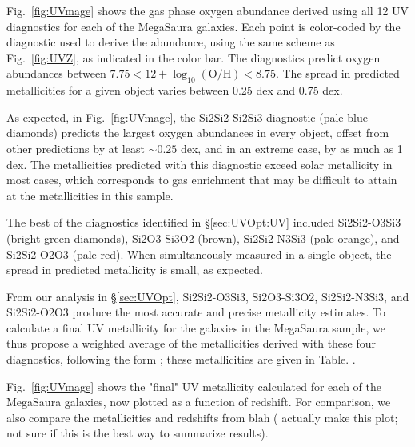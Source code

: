 \documentclass[preprint2]{aastex62}
\newcommand{\logten}{\ensuremath{\log_{10}}}
\newcommand{\logOH}{\ensuremath{\logten (\mathrm{O}/\mathrm{H})}\xspace}
\newcommand{\mage}{{\sc Meg}a{\sc S}a{\sc ura}\xspace}
\newcommand{\XXX}{{\bf \color{red}{XXX} }}
\begin{document}
Fig.~\ref{fig:UVmage} shows the gas phase oxygen abundance derived using all 12 UV diagnostics for each of the \mage galaxies. Each point is color-coded by the diagnostic used to derive the abundance, using the same scheme as Fig.~\ref{fig:UVZ}, as indicated in the color bar. The diagnostics predict oxygen abundances between $7.75< 12+$\logOH$<8.75$. The spread in predicted metallicities for a given object varies between 0.25 dex and 0.75 dex.

As expected, in Fig.~\ref{fig:UVmage}, the Si2Si2-Si2Si3 diagnostic (pale blue diamonds) predicts the largest oxygen abundances in every object, offset from other predictions by at least $\sim0.25$ dex, and in an extreme case, by as much as 1\,dex. The metallicities predicted with this diagnostic exceed solar metallicity in most cases, which corresponds to gas enrichment that may be difficult to attain at the metallicities in this sample.

The best of the diagnostics identified in \S\ref{sec:UVOpt:UV} included Si2Si2-O3Si3 (bright green diamonds), Si2O3-Si3O2 (brown), Si2Si2-N3Si3 (pale orange), and Si2Si2-O2O3 (pale red). When simultaneously measured in a single object, the spread in predicted metallicity is small, as expected.

From our analysis in \S\ref{sec:UVOpt}, Si2Si2-O3Si3, Si2O3-Si3O2, Si2Si2-N3Si3, and Si2Si2-O2O3 produce the most accurate and precise metallicity estimates. To calculate a final UV metallicity for the galaxies in the \mage sample, we thus propose a weighted average of the metallicities derived with these four diagnostics, following the form \XXX; these metallicities are given in Table.\XXX.

Fig.~\ref{fig:UVmage} shows the "final" UV metallicity calculated for each of the \mage galaxies, now plotted as a function of redshift. For comparison, we also compare the metallicities and redshifts from blah (\XXX actually make this plot; not sure if this is the best way to summarize results).
\end{document}
